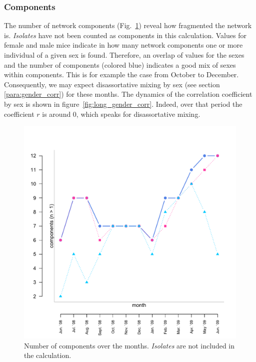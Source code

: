       
\subsubsection{Components}

The number of network components (Fig.~\ref{fig:long_comps}) reveal how fragmented the network is. \textit{Isolates} have not been counted as components in this calculation. Values for female and male mice indicate in how many network components one or more individual of a given sex is found. Therefore, an overlap of values for the sexes and the number of components (colored blue) indicates a good mix of sexes within components. This is for example the case from October to December. Consequently, we may expect disassortative mixing by sex (see section \ref{para:gender_corr}) for these months. The dynamics of the correlation coefficient by sex is shown in figure~\ref{fig:long_gender_corr}. Indeed, over that period the coefficient $r$ is around 0, which speaks for disassortative mixing.

\begin{figure}[htpb]
\begin{center}
  \includegraphics[width=.6\textwidth]{assets/pdf/long_comps.pdf}
  \caption[Number of components over the months]{Number of components over the months. \textit{Isolates} are not included in the calculation.}
  \label{fig:long_comps}
\end{center}
\end{figure}


% 

